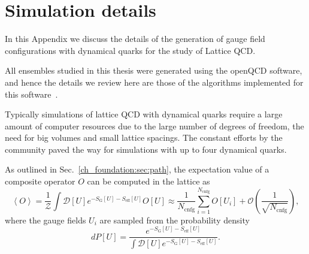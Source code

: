 
\chapter{Simulation details}
\label{appex_simulations}

In this Appendix we discuss the details of the generation of gauge field configurations with dynamical quarks for the study of Lattice QCD. 

All ensembles studied in this thesis were generated using the openQCD software, and hence the details we review here are those of the algorithms implemented for this software~\citep{Luscher:2012av,Luscher:2010ae}.

Typically simulations of lattice QCD with dynamical quarks require a large amount of computer resources due to the large number of degrees of freedom, the need for big volumes and small lattice spacings. The constant efforts by the community paved the way for simulations with up to four dynamical quarks. 

As outlined in Sec.~\ref{ch_foundation:sec:path}, the expectation value of a composite operator $O$ can be computed in the lattice as
\begin{equation}
\left<O\right>=\frac{1}{\mathcal{Z}}\int\mathcal{D}[U]e^{-S_{\textrm{G}}[U]-S_{\textrm{eff}}[U]}O[U]\approx\frac{1}{N_{\textrm{cnfg}}}\sum_{i=1}^{N_{\textrm{cnfg}}}O[U_i]+\mathcal{O}\left(\frac{1}{\sqrt{N_{\textrm{cnfg}}}}\right),
\end{equation}
where the gauge fields $U_i$ are sampled from the probability density
\begin{equation}
\label{appex_simulations:eq:PU}
dP[U]=\frac{e^{-S_{\textrm{G}}[U]-S_{\textrm{eff}}[U]}}{\int\mathcal{D}[U]e^{-S_{\textrm{G}}[U]-S_{\textrm{eff}}[U]}}.
\end{equation}

